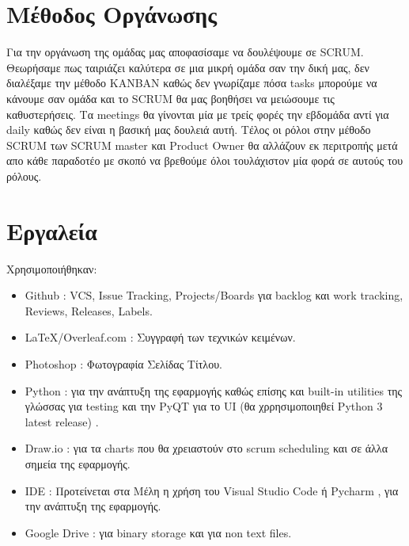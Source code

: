 \documentclass{article}
\begin{document}
\begin{center}
 
\end{center}

\section{Μέθοδος Οργάνωσης}
Για την οργάνωση της ομάδας μας αποφασίσαμε να δουλέψουμε σε SCRUM. Θεωρήσαμε πως ταιριάζει καλύτερα σε μια μικρή ομάδα σαν την δική μας, δεν διαλέξαμε την μέθοδο KANBAN καθώς δεν γνωρίζαμε πόσα tasks μπορούμε να κάνουμε σαν ομάδα και το SCRUM θα μας βοηθήσει να μειώσουμε τις καθυστερήσεις. Τα meetings θα γίνονται μία με τρείς φορές την εβδομάδα αντί για daily καθώς δεν είναι η βασική μας δουλειά αυτή. Τέλος οι ρόλοι στην μέθοδο SCRUM των SCRUM master και Product Owner θα αλλάζουν εκ περιτροπής μετά απο κάθε παραδοτέο με σκοπό να βρεθούμε όλοι τουλάχιστον μία φορά σε αυτούς του ρόλους.

\section{Εργαλεία}
Χρησιμοποιήθηκαν:
\begin{itemize}
    \item Github : VCS, Issue Tracking, Projects/Boards για backlog και work tracking, Reviews, Releases, Labels.
    \item \LaTeX/Overleaf.com : Συγγραφή των τεχνικών κειμένων.
    \item Photoshop : Φωτογραφία Σελίδας Τίτλου.
    \item Python : για την ανάπτυξη της εφαρμογής καθώς επίσης και built-in utilities της γλώσσας για testing και την PyQT για το UI (θα χρρησιμοποιηθεί Python 3 latest release) .
    \item Draw.io : για τα charts που θα χρειαστούν στο scrum scheduling και σε άλλα σημεία της εφαρμογής.
    \item IDE : Προτείνεται στα Mέλη η χρήση του Visual Studio Code ή Pycharm , για την ανάπτυξη της εφαρμογής.
    \item Google Drive : για binary storage και για non text files.
\end{itemize}
\end{document}
